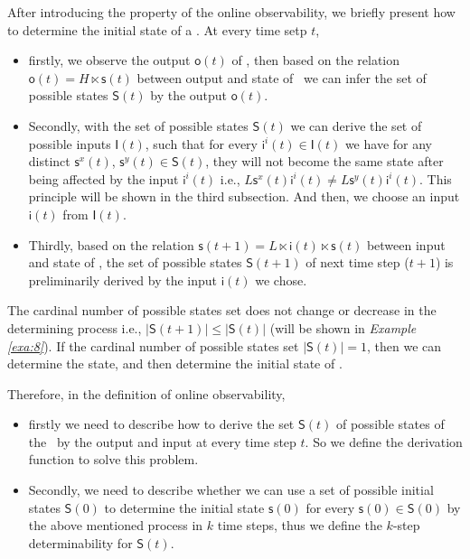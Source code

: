 After introducing the property of the online observability, we briefly present how to determine the initial state of a \BCN. At every time setp $t$, 
\begin{itemize}
\item firstly, we observe the output $\mathsf{o}(t)$ of \BCN, then based on the relation $\mathsf{o}(t)= H\ltimes{\mathsf{s}(t)}$ between output and state of \BCN\ we can infer the set of possible states $\mathsf{S}(t)$ by the output $\mathsf{o}(t)$.
\item Secondly, with the set of possible states $\mathsf{S}(t)$ we can derive the set of possible inputs $\mathsf{I}(t)$, such that for every $\mathsf{i}^{i}(t)\in \mathsf{I}(t)$ we have  for any distinct $\mathsf{s}^{x}(t)$, $\mathsf{s}^{y}(t) \in \mathsf{S}(t)$, they will not become the same state after being affected by the input $\mathsf{i}^{i}(t)$ i.e., $L\mathsf{s}^{x}(t) \mathsf{i}^{i}(t)\neq L\mathsf{s}^{y}(t) \mathsf{i}^{i}(t)$. This principle will be shown in the third subsection.  And then, we choose an input $\mathsf{i}(t)$ from $\mathsf{I}(t)$.
\item Thirdly, based on the relation $\mathsf{s}(t+1)= L\ltimes{\mathsf{i}(t)}\ltimes{\mathsf{s}(t)}$ between input and state of \BCN, the set of possible states $\mathsf{S}(t+1)$ of next time step ($t+1$) is preliminarily derived by the input $\mathsf{i}(t)$ we chose. 
\end{itemize} 
 The cardinal number of possible states set does not change or decrease in the determining process i.e., $|\mathsf{S}(t+1)|\le|\mathsf{S}(t)|$ (will be shown in {\em Example \ref{exa:8}}). If the cardinal number of possible states set $|\mathsf{S}(t)|=1$, then we can determine the state, and then determine the initial state of \BCN. 

Therefore, in the definition of online observability, 
\begin{itemize}
\item firstly we need to describe how to derive the set $\mathsf{S}(t)$ of possible states of the \BCN\ by the output and input at every time step $t$. So we define the derivation function to solve this problem.
\item  Secondly, we need to describe whether we can use a set of possible initial states $\mathsf{S}(0)$ to determine the initial state $\mathsf{s}(0)$ for every $\mathsf{s}(0) \in \mathsf{S}(0)$ by the above mentioned process in $k$ time steps, thus we define the $k$-step determinability for $\mathsf{S}(t)$. 
\end{itemize} 

